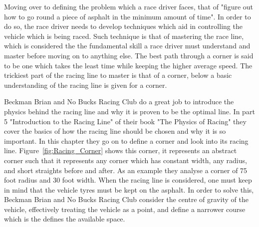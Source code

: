 \documentclass{article}
\begin{document}
Moving over to defining the problem which a race driver faces, that of "figure out how to go round a piece of asphalt in the minimum amount of time"\cite{GoingFaster}. In order to do so, the race driver needs to develop techniques which aid in controlling the vehicle which is being raced. Such technique is that of mastering the race line, which is considered the the fundamental skill a race driver must understand and master before moving on to anything else\cite{GoingFaster}. The best path through a corner is said to be one which takes the least time while keeping the higher average speed\cite{beckman1991physics}. The trickiest part of the racing line to master is that of a corner, below a basic understanding of the racing line is given for a corner.

Beckman Brian and No Bucks Racing Club do a great job to introduce the physics behind the racing line and why it is proven to be the optimal line. In part 5 "Introduction to the Racing Line" of their book "The Physics of Racing" they cover the basics of how the racing line should be chosen and why it is so important. In this chapter they go on to define a corner and look into its racing line. Figure~\ref{fig:Racing_Corner} shows this corner, it represents an abstract corner such that it represents  any corner which has constant width, any radius, and short straights before and after. As an example they analyse a corner of 75 foot radius and 30 foot width. When the racing line is considered, one must keep in mind that the vehicle tyres must be kept on the asphalt. In order to solve this, Beckman Brian and No Bucks Racing Club consider the centre of gravity of the vehicle, effectively treating the vehicle as a point, and define a narrower course which is the defines the available space.
	
\end{document}

